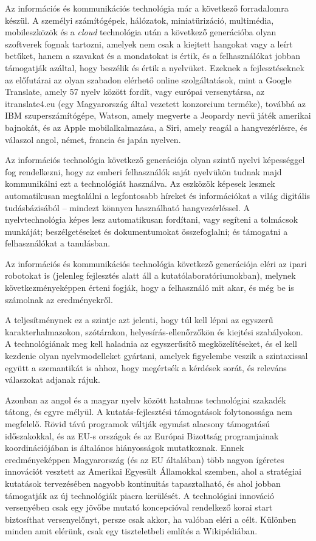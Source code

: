 \begin{multicols}{2}
Az információs és kommunikációs technológia már a következő forradalomra ké\-szül. A személyi számítógépek, hálózatok, miniatürizáció, multimédia, mobileszközök és a \textit{cloud} technológia után a következő generációba olyan szoftverek fognak tartozni, amelyek nem csak a kiejtett hangokat vagy a leírt betűket, hanem a szavakat és a mondatokat is értik, és a felhasználókat jobban támogatják azáltal, hogy beszélik és értik a nyelvüket. Ezeknek a fejlesztéseknek az előfutárai az olyan szabadon elérhető online szolgáltatások, mint a Google Translate, amely 57 nyelv között fordít, vagy európai versenytársa, az itranslate4.eu (egy Magyarország által vezetett konzorcium terméke), továbbá az IBM szuperszámítógépe, Watson, amely megverte a Jeopardy nevű játék amerikai bajnokát, és az Apple mobilalkalmazása, a Siri, amely reagál a hangvezérlésre, és válaszol angol, német, francia és japán nyelven.  

Az információs technológia következő generációja olyan szintű nyelvi képességgel fog rendelkezni, hogy az emberi felhasználók saját nyelvükön tudnak majd kommunikálni ezt a technológiát használva. Az eszközök képesek lesznek automatikusan megtalálni a legfontosabb híreket és információkat a világ digitális tudásbázisából -- mindezt könnyen használható hangvezérléssel. A nyelvtechnológia képes lesz auto\-ma\-ti\-ku\-san fordítani, vagy segíteni a tolmácsok munkáját; beszélgetéseket és dokumentumokat összefoglalni; és támogatni a felhasználókat a tanulásban. 

Az információs és kommunikációs technológia következő generációja eléri az ipari robotokat is (jelenleg fejlesztés alatt áll a kutatólaboratóriumokban), melynek kö\-vet\-kez\-mé\-nye\-kép\-pen érteni fogják, hogy a felhasználó mit akar, és még be is számolnak az eredményekről. 

A teljesítménynek ez a szintje azt jelenti, hogy túl kell lépni az egyszerű karakterhalmazokon, szótárakon, helyesírás-ellenőrzőkön és kiejtési szabályokon. A technológiának meg kell haladnia az egyszerűsítő megközelítéseket, és el kell kezdenie olyan nyelvmodelleket gyártani, amelyek figyelembe veszik a szintaxissal együtt a szemantikát is ahhoz, hogy megértsék a kérdések sorát, és releváns válaszokat adjanak rájuk. 

Azonban az angol és a magyar nyelv között hatalmas technológiai szakadék tátong, és egyre mélyül. A kutatás-fejlesztési támogatások foly\-to\-nos\-sá\-ga nem megfelelő. Rövid távú prog\-ra\-mok váltják egymást alacsony támogatású időszakokkal, és az EU-s országok és az Európai Bizottság programjainak koordinációjában is általános hiá\-nyos\-sá\-gok mutatkoznak. Ennek eredményeképpen Magyarország (és az EU általában) több nagyon ígéretes innovációt vesztett az Amerikai Egyesült Államokkal szemben, ahol a stratégiai kutatások tervezésében nagyobb kontinuitás tapasztalható, és ahol jobban támogatják az új technológiák piacra kerülését. A technológiai innováció versenyében csak egy jövőbe mutató koncepcióval rendelkező korai start biztosíthat versenyelőnyt, persze csak akkor, ha valóban eléri a célt. Különben minden amit elérünk, csak egy tiszteletbeli említés a Wikipédiában. 


\end{multicols}
